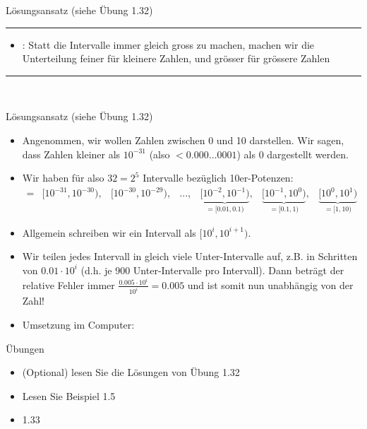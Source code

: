 \begin{frame}{Lösungsansatz (siehe Übung 1.32)}
\rule{\textwidth}{0.4pt}
\begin{itemize}
    \item {}: Statt die Intervalle immer gleich gross zu machen, machen wir die Unterteilung feiner für kleinere Zahlen, und grösser für grössere Zahlen
\end{itemize}\rule{\textwidth}{0.4pt}\\
\end{frame}
\begin{frame}{Lösungsansatz (siehe Übung 1.32)}
\begin{itemize}[<+->]
    \item Angenommen, wir wollen Zahlen zwischen 0 und 10 darstellen. Wir sagen, dass Zahlen kleiner als $10^{-31}$ (also $< 0.000\ldots 0001$) als 0 dargestellt werden.
    \item Wir haben für also $32 = 2^5$ Intervalle bezüglich 10er-Potenzen:
    \scriptsize\begin{align*}
        =&[10^{-31}, 10^{-30}),&[10^{-30}, 10^{-29}),&...,&\underbrace{[10^{-2}, 10^{-1})}_{=[0.01, 0.1)},&\underbrace{[10^{-1}, 10^0)}_{=[0.1, 1)},& \underbrace{[10^0, 10^1)}_{=[1, 10)}&
    \end{align*}\normalsize
    \item Allgemein schreiben wir ein Intervall als $[10^i, 10^{i+1})$.
    \item Wir teilen jedes Intervall in gleich viele Unter-Intervalle auf, z.B. in Schritten von $0.01\cdot 10^i$ (d.h. je 900 Unter-Intervalle pro Intervall)\only<4>{\footnote{Die Unter-Intervalle des grössten Intervalls sind beispielsweise: $[1.00, 1.01), [1.01, 1.02), [1.02, 1.03), ..., [9.98, 9.99), [9.99, 10.00)$}}. Dann beträgt der relative Fehler immer $\frac{0.005\cdot 10^i}{10^i}=0.005$ und ist somit nun unabhängig von der Zahl!
    \item Umsetzung im Computer:
    {\centering\Bitfeld[exp=5, mant=10, width=13.2]\par}
\end{itemize}
\end{frame}

\begin{frame}{Übungen}
\begin{itemize}
    \item (Optional) lesen Sie die Lösungen von Übung 1.32
    \item Lesen Sie Beispiel 1.5
    \item 1.33
\end{itemize}
\end{frame}